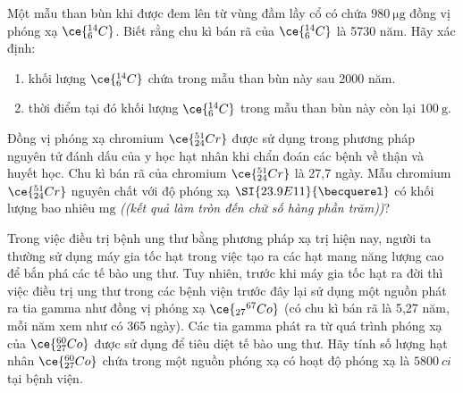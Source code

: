 \begin{ex}
	Một mẫu than bùn khi được đem lên từ vùng đầm lầy cổ có chứa $\SI{980}{\micro\gram}$ đồng vị phóng xạ $\ce{_6^{14}C}$. Biết rằng chu kì bán rã của $\ce{_6^{14}C}$ là 5730 năm. Hãy xác định:
	\begin{enumerate}[label=\alph*)]
		\item khối lượng $\ce{_6^{14}C}$ chứa trong mẫu than bùn này sau 2000 năm.
		\item thời điểm tại đó khối lượng $\ce{_6^{14}C}$ trong mẫu than bùn này còn lại $\SI{100}{\gram}$.
	\end{enumerate}
\end{ex}
\begin{ex}
	Đồng vị phóng xạ chromium $\ce{_{24}^{51}Cr}$ được sử dụng trong phương pháp nguyên tử đánh dấu của y học hạt nhân khi chẩn đoán các bệnh về thận và huyết học. Chu kì bán rã của chromium $\ce{_{24}^{51}Cr}$ là 27,7 ngày. Mẫu chromium $\ce{_{24}^{51}Cr}$ nguyên chất với độ phóng xạ $\SI{23.9E11}{\becquerel}$ có khối lượng bao nhiêu $\si{\milli\gram}$ \textit{((kết quả làm tròn đến chữ số hàng phần trăm))}?
\end{ex}
\begin{ex}
	Trong việc điều trị bệnh ung thư bằng phương pháp xạ trị hiện nay, người ta thường sử dụng máy gia tốc hạt trong việc tạo ra các hạt mang năng lượng cao để bắn phá các tế bào ung thư. Tuy nhiên, trước khi máy gia tốc hạt ra đời thì việc điều trị ung thư trong các bệnh viện trước đây lại sử dụng một nguồn phát ra tia gamma như đồng vị phóng xạ $\ce{_{27}{ }^{67}Co}$ (có chu kì bán rã là 5,27 năm, mỗi năm xem như có 365 ngày). Các tia gamma phát ra từ quá trình phóng xạ của $\ce{_{27}^{60}Co}$ được sử dụng để tiêu diệt tế bào ung thư. Hãy tính số lượng hạt nhân $\ce{_{27}^{60}Co}$ chứa trong một nguồn phóng xạ có hoạt độ phóng xạ là $\SI{5800}{ci}$ tại bệnh viện.
\end{ex}

